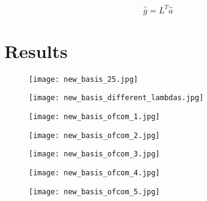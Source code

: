 \begin{equation}
\hat{g} = L^{T} \hat{a}
\end{equation}


\section{Results}

\begin{figure}[h]
\centering
\texttt{[image: new\_basis\_25.jpg]}
\caption{}
\label{fig:new_basis_25}
\end{figure}

\begin{figure}[h]
\centering
\texttt{[image: new\_basis\_different\_lambdas.jpg]}
\caption{}
\label{fig:new_basis_25}
\end{figure}

\begin{figure}[h]
\centering
\texttt{[image: new\_basis\_ofcom\_1.jpg]}
\caption{}
\label{fig:new_basis_25}
\end{figure}
\begin{figure}[h]
\centering
\texttt{[image: new\_basis\_ofcom\_2.jpg]}
\caption{}
\label{fig:new_basis_25}
\end{figure}
\begin{figure}[h]
\centering
\texttt{[image: new\_basis\_ofcom\_3.jpg]}
\caption{}
\label{fig:new_basis_25}
\end{figure}
\begin{figure}[h]
\centering
\texttt{[image: new\_basis\_ofcom\_4.jpg]}
\caption{}
\label{fig:new_basis_25}
\end{figure}

\begin{figure}[h]
\centering
\texttt{[image: new\_basis\_ofcom\_5.jpg]}
\caption{}
\label{fig:new_basis_25}
\end{figure}
